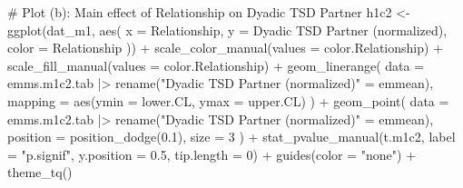 \documentclass[
  bookmarksnumbered]{article}
\newenvironment{Shaded}{\begin{snugshade}}{\end{snugshade}}
\newcommand{\AttributeTok}[1]{\textcolor[rgb]{0.80,0.80,0.80}{#1}}
\newcommand{\CommentTok}[1]{\textcolor[rgb]{0.50,0.62,0.50}{#1}}
\newcommand{\DecValTok}[1]{\textcolor[rgb]{0.86,0.86,0.80}{#1}}
\newcommand{\FloatTok}[1]{\textcolor[rgb]{0.75,0.75,0.82}{#1}}
\newcommand{\FunctionTok}[1]{\textcolor[rgb]{0.94,0.94,0.56}{#1}}
\newcommand{\NormalTok}[1]{\textcolor[rgb]{0.80,0.80,0.80}{#1}}
\newcommand{\OtherTok}[1]{\textcolor[rgb]{0.94,0.94,0.56}{#1}}
\newcommand{\SpecialCharTok}[1]{\textcolor[rgb]{0.86,0.64,0.64}{#1}}
\newcommand{\StringTok}[1]{\textcolor[rgb]{0.80,0.58,0.58}{#1}}
\begin{document}
\begin{Shaded}
\begin{Highlighting}[]
\CommentTok{\# Plot (b): Main effect of Relationship on Dyadic TSD Partner}
\NormalTok{h1c2 }\OtherTok{\textless{}{-}} \FunctionTok{ggplot}\NormalTok{(dat\_m1, }\FunctionTok{aes}\NormalTok{(}
  \AttributeTok{x =}\NormalTok{ Relationship, }\AttributeTok{y =} \StringTok{\textasciigrave{}}\AttributeTok{Dyadic TSD Partner (normalized)}\StringTok{\textasciigrave{}}\NormalTok{, }\AttributeTok{color =}\NormalTok{ Relationship}
\NormalTok{)) }\SpecialCharTok{+}
  \FunctionTok{scale\_color\_manual}\NormalTok{(}\AttributeTok{values =}\NormalTok{ color.Relationship) }\SpecialCharTok{+}
  \FunctionTok{scale\_fill\_manual}\NormalTok{(}\AttributeTok{values =}\NormalTok{ color.Relationship) }\SpecialCharTok{+}
  \FunctionTok{geom\_linerange}\NormalTok{(}
    \AttributeTok{data =}\NormalTok{ emms.m1c2.tab }\SpecialCharTok{|\textgreater{}} \FunctionTok{rename}\NormalTok{(}\StringTok{"Dyadic TSD Partner (normalized)"} \OtherTok{=}\NormalTok{ emmean),}
    \AttributeTok{mapping =} \FunctionTok{aes}\NormalTok{(}\AttributeTok{ymin =}\NormalTok{ lower.CL, }\AttributeTok{ymax =}\NormalTok{ upper.CL)}
\NormalTok{  ) }\SpecialCharTok{+}
  \FunctionTok{geom\_point}\NormalTok{(}
    \AttributeTok{data =}\NormalTok{ emms.m1c2.tab }\SpecialCharTok{|\textgreater{}} \FunctionTok{rename}\NormalTok{(}\StringTok{"Dyadic TSD Partner (normalized)"} \OtherTok{=}\NormalTok{ emmean),}
    \AttributeTok{position =} \FunctionTok{position\_dodge}\NormalTok{(}\FloatTok{0.1}\NormalTok{), }\AttributeTok{size =} \DecValTok{3}
\NormalTok{  ) }\SpecialCharTok{+}
  \FunctionTok{stat\_pvalue\_manual}\NormalTok{(t.m1c2, }\AttributeTok{label =} \StringTok{"p.signif"}\NormalTok{, }\AttributeTok{y.position =} \FloatTok{0.5}\NormalTok{, }\AttributeTok{tip.length =} \DecValTok{0}\NormalTok{) }\SpecialCharTok{+}
  \FunctionTok{guides}\NormalTok{(}\AttributeTok{color =} \StringTok{"none"}\NormalTok{) }\SpecialCharTok{+}
  \FunctionTok{theme\_tq}\NormalTok{()}


\end{Highlighting}
\end{Shaded}
\end{document}
